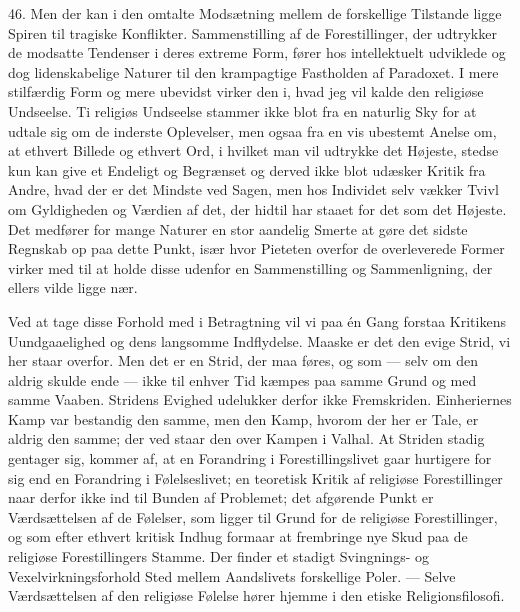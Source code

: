 \documentclass[12pt,a4paper,openany]{book}
\newcommand{\opage}[1]{\marginnote{\footnotesize\textit{[#1]}}}
\begin{document}
46. Men der kan i den omtalte Modsætning mellem de forskellige Tilstande
ligge Spiren til tragiske Konflikter. Sammenstilling af de
Forestillinger, der udtrykker de modsatte Tendenser i deres extreme
Form, fører hos intellektuelt udviklede og dog lidenskabelige Naturer
til den krampagtige Fastholden af Paradoxet. I mere stilfærdig Form og
mere ubevidst virker den i, hvad jeg vil kalde den religiøse Undseelse.
Ti religiøs Undseelse stammer ikke blot fra en naturlig Sky for at
udtale sig om de inderste Oplevelser, men ogsaa fra en vis ubestemt
Anelse om, at ethvert Billede og ethvert Ord, i hvilket man vil udtrykke
det Højeste, stedse kun kan give et Endeligt og Begrænset og derved ikke
blot udæsker Kritik fra Andre, hvad der er det Mindste ved Sagen, men
hos Individet selv vækker Tvivl om Gyldigheden og Værdien af det, der
hidtil har staaet for det som det Højeste. Det medfører for mange
Naturer en stor aandelig Smerte at gøre det sidste Regnskab op paa dette
Punkt, især hvor Pieteten overfor de overleverede Former virker med til
at holde disse udenfor en Sammenstilling og Sammenligning, der ellers
vilde ligge nær.

Ved at tage disse Forhold med i Betragtning vil vi paa én Gang forstaa
Kritikens Uundgaaelighed og dens langsomme Indflydelse. Maaske er det
den evige Strid, vi her staar overfor. Men det er en Strid, der maa
føres, og som --- selv om den aldrig skulde ende --- ikke til enhver Tid
kæmpes paa samme Grund og med samme Vaaben. Stridens Evighed udelukker
derfor ikke Fremskriden. Einheriernes Kamp var bestandig den samme, men
den Kamp, hvorom der her er Tale, er aldrig den samme; der%
\opage{108}ved staar den over Kampen i Valhal. At Striden stadig
gentager sig, kommer af, at en Forandring i Forestillingslivet gaar
hurtigere for sig end en Forandring i Følelseslivet; en teoretisk Kritik
af religiøse Forestillinger naar derfor ikke ind til Bunden af
Problemet; det afgørende Punkt er Værdsættelsen af de Følelser, som
ligger til Grund for de religiøse Forestillinger, og som efter ethvert
kritisk Indhug formaar at frembringe nye Skud paa de religiøse
Forestillingers Stamme. Der finder et stadigt Svingnings- og
Vexelvirkningsforhold Sted mellem Aandslivets forskellige Poler. ---
Selve Værdsættelsen af den religiøse Følelse hører hjemme i den etiske
Religionsfilosofi.
\end{document}
